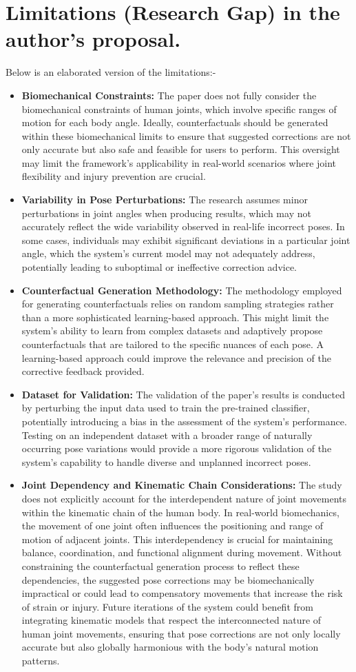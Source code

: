 \section{Limitations (Research Gap) in the author's proposal.}
Below is an elaborated version of the limitations:- 
\begin{itemize}
\item \textbf{Biomechanical Constraints:}
The paper does not fully consider the biomechanical constraints of human joints, which involve specific ranges of motion for each body angle. Ideally, counterfactuals should be generated within these biomechanical limits to ensure that suggested corrections are not only accurate but also safe and feasible for users to perform. This oversight may limit the framework's applicability in real-world scenarios where joint flexibility and injury prevention are crucial.
\item \textbf{Variability in Pose Perturbations:}
The research assumes minor perturbations in joint angles when producing results, which may not accurately reflect the wide variability observed in real-life incorrect poses. In some cases, individuals may exhibit significant deviations in a particular joint angle, which the system's current model may not adequately address, potentially leading to suboptimal or ineffective correction advice.
\item \textbf{Counterfactual Generation Methodology:}
The methodology employed for generating counterfactuals relies on random sampling strategies rather than a more sophisticated learning-based approach. This might limit the system's ability to learn from complex datasets and adaptively propose counterfactuals that are tailored to the specific nuances of each pose. A learning-based approach could improve the relevance and precision of the corrective feedback provided.
\item \textbf{Dataset for Validation:}
The validation of the paper's results is conducted by perturbing the input data used to train the pre-trained classifier, potentially introducing a bias in the assessment of the system's performance. Testing on an independent dataset with a broader range of naturally occurring pose variations would provide a more rigorous validation of the system's capability to handle diverse and unplanned incorrect poses.
\item \textbf{Joint Dependency and Kinematic Chain Considerations:}
The study does not explicitly account for the interdependent nature of joint movements within the kinematic chain of the human body. In real-world biomechanics, the movement of one joint often influences the positioning and range of motion of adjacent joints. This interdependency is crucial for maintaining balance, coordination, and functional alignment during movement. Without constraining the counterfactual generation process to reflect these dependencies, the suggested pose corrections may be biomechanically impractical or could lead to compensatory movements that increase the risk of strain or injury. Future iterations of the system could benefit from integrating kinematic models that respect the interconnected nature of human joint movements, ensuring that pose corrections are not only locally accurate but also globally harmonious with the body's natural motion patterns.

\end{itemize}

